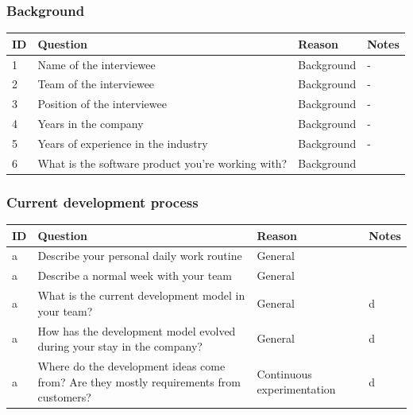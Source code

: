 \documentclass[english]{tktltiki2}
\theoremstyle{definition}
\theoremstyle{remark}
\begin{document}
\subsubsection{Background}

\begin{center}
    \begin{tabular}{ | l | l | l | p{5cm} |} 
    \hline
    ID & Question & Reason & Notes \\ \hline
    1 & Name of the interviewee & Background & - \\ \hline
    2 & Team of the interviewee & Background & - \\ \hline
    3 & Position of the interviewee & Background & - \\ \hline
    4 & Years in the company & Background & - \\ \hline
    5 & Years of experience in the industry & Background & - \\ \hline
    6 & What is the software product you're working with? & Background &  \\ \hline
    \hline
    \end{tabular}
\end{center}

\subsubsection{Current development process}

\begin{center}
    \begin{tabular}{ | l | l | l | p{5cm} |}
    \hline
    ID & Question & Reason & Notes \\ \hline
    a & Describe your personal daily work routine & General & \\ \hline
    a & Describe a normal week with your team & General & \\ \hline
    a & What is the current development model in your team? & General & d \\ \hline
    a & How has the development model evolved during your stay in the company? & General & d \\ \hline
    a & Where do the development ideas come from? Are they mostly requirements from customers? & Continuous experimentation & d \\ \hline
    \hline
    \end{tabular}
\end{center}
\end{document}
